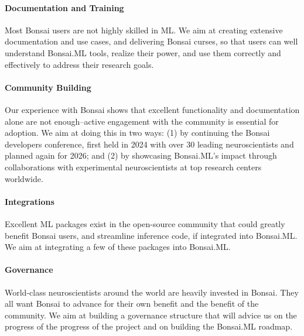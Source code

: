 
\paragraph{Documentation and Training} Most Bonsai users are not highly skilled
in ML. We aim at creating extensive documentation and use cases, and delivering
Bonsai curses, so that users can well understand Bonsai.ML tools, realize their
power, and use them correctly and effectively to address their research goals.

\paragraph{Community Building} Our experience with Bonsai shows that excellent
functionality and documentation alone are not enough--active engagement with the
community is essential for adoption. We aim at doing this in two ways: (1) by
continuing the Bonsai developers conference, first held in 2024 with over 30
leading neuroscientists and planned again for 2026; and (2) by showcasing
Bonsai.ML’s impact through collaborations with experimental neuroscientists at
top research centers worldwide.

\paragraph{Integrations} Excellent ML packages exist in the open-source
community that could greatly benefit Bonsai users, and streamline
inference code, if integrated into Bonsai.ML. We aim at integrating a few of
these packages into Bonsai.ML.

\paragraph{Governance} World-class neuroscientists around the world are heavily
invested in Bonsai. They all want Bonsai to advance for their own benefit and
the benefit of the community. We aim at building a governance structure that
will advice us on the progress of the progress of the project and on building
the Bonsai.ML roadmap.
